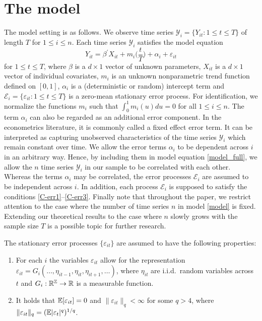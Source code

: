 
\section{The model}\label{sec-model}

The model setting is as follows. We observe time series $\mathcal{Y}_i = \{Y_{it}: 1 \le t \le T \}$ of length $T$ for $1 \le i \le n$. Each time series $\mathcal{Y}_i$ satisfies the model equation \begin{equation}\label{model_full}
Y_{it} = \beta^\prime X_{it} + m_i \Big( \frac{t}{T} \Big) + \alpha_i + \varepsilon_{it} 
\end{equation}
for $1 \le t \le T$, where $\beta$ is a $d \times 1$ vector of unknown parameters, $X_{it}$ is a $d\times 1$ vector of individual covariates, $m_i$ is an unknown nonparametric trend function defined on $[0,1]$, $\alpha_i$ is a (deterministic or random) intercept term and $\mathcal{E}_i = \{ \varepsilon_{it}: 1 \le t \le T \}$ is a zero-mean stationary error process. For identification, we normalize the functions $m_i$ such that $\int_0^1 m_i(u) du = 0$ for all $1 \le i \le n$. The term $\alpha_i$ can also be regarded as an additional error component. In the econometrics literature, it is commonly called a fixed effect error term. It can be interpreted as capturing unobserved characteristics of the time series $\mathcal{Y}_i$ which remain constant over time. We allow the error terms $\alpha_i$ to be dependent across $i$ in an arbitrary way. Hence, by including them in model equation \eqref{model_full}, we allow the $n$ time series $\mathcal{Y}_i$ in our sample to be correlated with each other. Whereas the terms $\alpha_i$ may be correlated, the error processes $\mathcal{E}_i$ are assumed to be independent across $i$. In addition, each process $\mathcal{E}_i$ is supposed to satisfy the conditions \ref{C-err1}--\ref{C-err3}. Finally note that throughout the paper, we restrict attention to the case where the number of time series $n$ in model \eqref{model} is fixed. Extending our theoretical results to the case where $n$ slowly grows with the sample size $T$ is a possible topic for further research.

The stationary error processes $\{\varepsilon_{it}\}$ are assumed to have the following properties: 
\begin{enumerate}[label=(C\arabic*),leftmargin=1.05cm]

\item \label{C-err1} For each $i$ the variables $\varepsilon_{it}$ allow for the representation $\varepsilon_{it} = G_i(\ldots,\eta_{it-1},\eta_{it},\eta_{it+1},\ldots)$, where $\eta_{it}$ are i.i.d.\ random variables across $t$ and $G_i: \mathbb{R}^{\mathbb{Z}} \rightarrow \mathbb{R}$ is a measurable function. 

\item \label{C-err2} It holds that $\mathbb{E}[\varepsilon_{it}] =0$ and $\| \varepsilon_{it} \|_q < \infty$ for some $q > 4$, where $\| \varepsilon_{it} \|_q = (\mathbb{E}|\varepsilon_t|^q)^{1/q}$. 

\end{enumerate}

